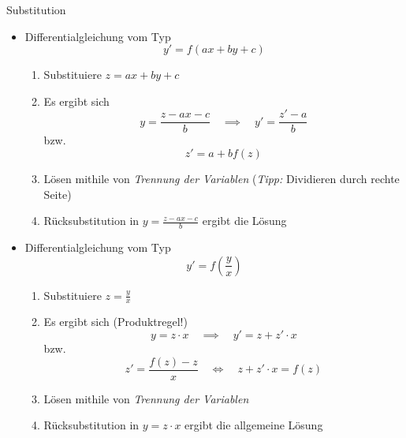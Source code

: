 \documentclass[german]{../spicker}
\begin{document}
\begin{algo}{Substitution}
    \begin{itemize}
        \item Differentialgleichung vom Typ
              $$
                  \boxed{y' = f(ax + by + c)}
              $$
              \begin{enumerate}
                  \item Substituiere $z = ax + by + c$
                  \item Es ergibt sich
                        $$
                            y = \frac{z -ax - c}{b} \quad \implies \quad y' = \frac{z' - a}{b}
                        $$
                        bzw.
                        $$
                            z' = a + bf(z)
                        $$
                  \item Lösen mithile von \emph{Trennung der Variablen} (\emph{Tipp:} Dividieren durch rechte Seite)
                  \item Rücksubstitution in $y = \frac{z -ax - c}{b}$ ergibt die Lösung
              \end{enumerate}
        \item Differentialgleichung vom Typ
              $$
                  \boxed{y' = f\left(\frac{y}{x}\right)}
              $$
              \begin{enumerate}
                  \item Substituiere $z = \frac{y}{x}$
                  \item Es ergibt sich (Produktregel!)
                        $$
                            y = z \cdot x \quad \implies \quad y' = z + z' \cdot x
                        $$
                        bzw.
                        $$
                            z' = \frac{f(z) - z}{x} \quad \iff \quad z + z' \cdot x = f(z)
                        $$
                  \item Lösen mithile von \emph{Trennung der Variablen}
                  \item Rücksubstitution in $y = z \cdot x$ ergibt die allgemeine Lösung
              \end{enumerate}
    \end{itemize}
\end{algo}
\end{document}
